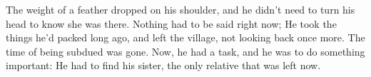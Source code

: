 The weight of a feather dropped on his shoulder, and he didn't need to turn his head to know she was there. 
Nothing had to be said right now; He took the things he'd packed long ago, and left the village, not looking back once more. 
The time of being subdued was gone. Now, he had a task, and he was to do something important: He had to find his sister, the only relative that was left now. 

